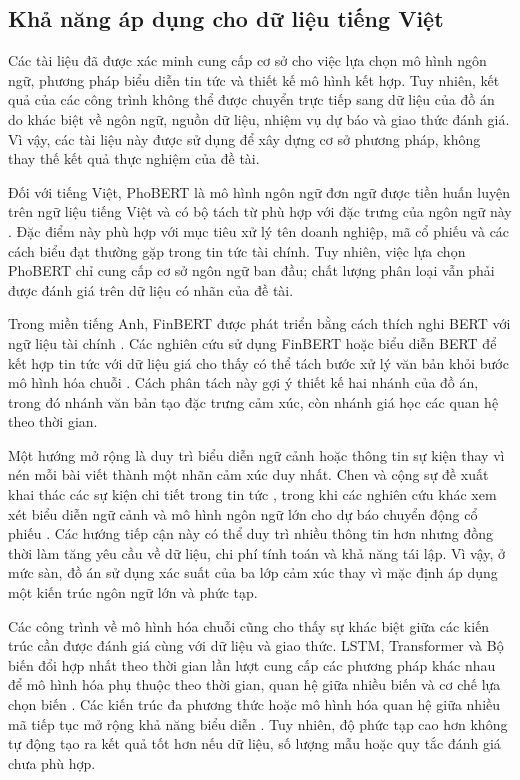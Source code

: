 \documentclass[12pt, a4paper, oneside]{report}
\begin{document}
\subsection{Khả năng áp dụng cho dữ liệu tiếng Việt}

Các tài liệu đã được xác minh cung cấp cơ sở cho việc lựa chọn mô hình ngôn ngữ, phương
pháp biểu diễn tin tức và thiết kế mô hình kết hợp. Tuy nhiên, kết quả của các công
trình không thể được chuyển trực tiếp sang dữ liệu của đồ án do khác biệt về ngôn ngữ,
nguồn dữ liệu, nhiệm vụ dự báo và giao thức đánh giá. Vì vậy, các tài liệu này được sử
dụng để xây dựng cơ sở phương pháp, không thay thế kết quả thực nghiệm của đề tài.

Đối với tiếng Việt, PhoBERT là mô hình ngôn ngữ đơn ngữ được tiền huấn luyện trên ngữ
liệu tiếng Việt và có bộ tách từ phù hợp với đặc trưng của ngôn ngữ này
\cite{Nguyen2020_200300744v3}. Đặc điểm này phù hợp với mục tiêu xử lý tên doanh nghiệp,
mã cổ phiếu và các cách biểu đạt thường gặp trong tin tức tài chính. Tuy nhiên, việc
lựa chọn PhoBERT chỉ cung cấp cơ sở ngôn ngữ ban đầu; chất lượng phân loại vẫn phải
được đánh giá trên dữ liệu có nhãn của đề tài.

Trong miền tiếng Anh, FinBERT được phát triển bằng cách thích nghi BERT với ngữ liệu
tài chính \cite{Yang2020_200608097v2}. Các nghiên cứu sử dụng FinBERT hoặc biểu diễn
BERT để kết hợp tin tức với dữ liệu giá cho thấy có thể tách bước xử lý văn bản khỏi
bước mô hình hóa chuỗi \cite{Halder2022_221107392v1,Gu2024_240716150v1,
Chen2021_210708721v1}. Cách phân tách này gợi ý thiết kế hai nhánh của đồ án, trong đó
nhánh văn bản tạo đặc trưng cảm xúc, còn nhánh giá học các quan hệ theo thời gian.

Một hướng mở rộng là duy trì biểu diễn ngữ cảnh hoặc thông tin sự kiện thay vì nén mỗi
bài viết thành một nhãn cảm xúc duy nhất. Chen và cộng sự đề xuất khai thác các sự kiện
chi tiết trong tin tức \cite{Chen2019_191005078v1}, trong khi các nghiên cứu khác xem
xét biểu diễn ngữ cảnh và mô hình ngôn ngữ lớn cho dự báo chuyển động cổ phiếu
\cite{Chen2021_210708721v1,Elahi2024_241101368v1,Liang2024_241210823v2}. Các hướng
tiếp cận này có thể duy trì nhiều thông tin hơn nhưng đồng thời làm tăng yêu cầu về dữ
liệu, chi phí tính toán và khả năng tái lập. Vì vậy, ở mức sàn, đồ án sử dụng xác suất
của ba lớp cảm xúc thay vì mặc định áp dụng một kiến trúc ngôn ngữ lớn và phức tạp.

Các công trình về mô hình hóa chuỗi cũng cho thấy sự khác biệt giữa các kiến trúc cần được đánh giá cùng với dữ liệu và giao thức. LSTM, Transformer và Bộ biến
đổi hợp nhất theo thời gian lần lượt cung cấp các phương pháp khác nhau để mô hình hóa
phụ thuộc theo thời gian, quan hệ giữa nhiều biến và cơ chế lựa chọn biến
\cite{Hochreiter1997_lstm,Vaswani2017_attention,Lim2021_tft}. Các kiến trúc đa phương
thức hoặc mô hình hóa quan hệ giữa nhiều mã tiếp tục mở rộng khả năng biểu diễn
\cite{Omranpour2024_241210540v1,Boyle2023_230503835v1,Xu2021_211013716v2,
Zhao2023_230609862v3}. Tuy nhiên, độ phức tạp cao hơn không tự động tạo ra kết quả tốt
hơn nếu dữ liệu, số lượng mẫu hoặc quy tắc đánh giá chưa phù hợp.
\end{document}
